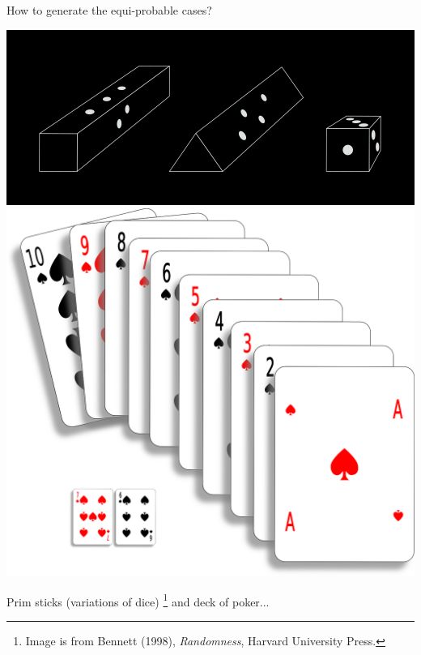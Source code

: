 \documentclass[9pt]{beamer}
\begin{document}
\begin{frame}[fragile] %
 \begin{center}
   How to generate the equi-probable cases?
 \end{center}
 \vfill \pause
 \begin{center}
   \includegraphics[scale=0.20]{./figs/prism_stick_dice-neg.png}
   \includegraphics[scale=0.07]{./figs/card-deck.png}
   \bigskip

   Prim sticks (variations of dice) \footnote{Image is from Bennett (1998), {\it Randomness},
   Harvard University Press.} and deck of poker...
 \end{center}
\end{frame}
\end{document}
